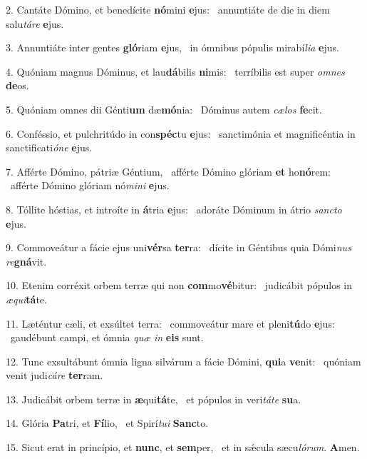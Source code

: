 2. Cantáte Dómino, et benedícite \textbf{nó}mini \textbf{e}jus: \ast\  annuntiáte de die in diem salu\textit{tá}\textit{re} \textbf{e}jus.\

3. Annuntiáte inter gentes \textbf{gló}riam \textbf{e}jus, \ast\  in ómnibus pópulis mirabí\textit{li}\textit{a} \textbf{e}jus.\

4. Quóniam magnus Dóminus, et lau\textbf{dá}bilis \textbf{ni}mis: \ast\  terríbilis est super \textit{om}\textit{nes} \textbf{de}os.\

5. Quóniam omnes dii Génti\textbf{um} dæ\textbf{mó}nia: \ast\  Dóminus autem \textit{cæ}\textit{los} \textbf{fe}cit.\

6. Conféssio, et pulchritúdo in con\textbf{spéc}tu \textbf{e}jus: \ast\  sanctimónia et magnificéntia in sanctificati\textit{ó}\textit{ne} \textbf{e}jus.\

7. Afférte Dómino, pátriæ Géntium, \dag\  afférte Dómino glóriam \textbf{et} ho\textbf{nó}rem: \ast\  afférte Dómino glóriam nó\textit{mi}\textit{ni} \textbf{e}jus.\

8. Tóllite hóstias, et introíte in \textbf{á}tria \textbf{e}jus: \ast\  adoráte Dóminum in átrio \textit{sanc}\textit{to} \textbf{e}jus.\

9. Commoveátur a fácie ejus uni\textbf{vér}sa \textbf{ter}ra: \ast\  dícite in Géntibus quia Dómi\textit{nus} \textit{re}\textbf{gná}vit.\

10. Etenim corréxit orbem terræ qui non \textbf{com}mo\textbf{vé}bitur: \ast\  judicábit pópulos in \textit{æ}\textit{qui}\textbf{tá}te.\

11. Læténtur cæli, et exsúltet terra: \dag\  commoveátur mare et pleni\textbf{tú}do \textbf{e}jus: \ast\  gaudébunt campi, et ómnia \textit{quæ} \textit{in} \textbf{e}\textbf{is} sunt.\

12. Tunc exsultábunt ómnia ligna silvárum a fácie Dómini, \textbf{qui}a \textbf{ve}nit: \ast\  quóniam venit judi\textit{cá}\textit{re} \textbf{ter}ram.\

13. Judicábit orbem terræ in \textbf{æ}qui\textbf{tá}te, \ast\  et pópulos in veri\textit{tá}\textit{te} \textbf{su}a.\

14. Glória \textbf{Pa}tri, et \textbf{Fí}lio, \ast\  et Spirí\textit{tu}\textit{i} \textbf{Sanc}to.\

15. Sicut erat in princípio, et \textbf{nunc}, et \textbf{sem}per, \ast\  et in sǽcula sæcu\textit{ló}\textit{rum}. \textbf{A}men.\

